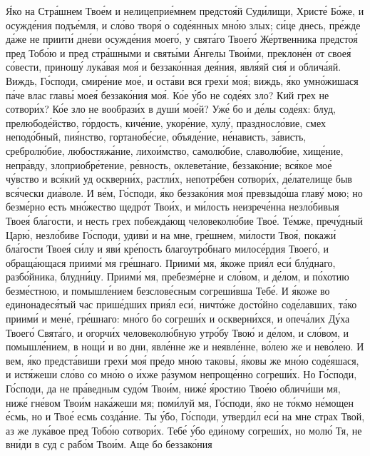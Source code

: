 \begin{mymulticols}
\'{Я}ко на Стр\'{а}шнем Тво\'{е}м и нелицепри\'{е}мнем предсто\'{я}й Суд\'{и}лищи, Христ\'{е} Б\'{о}же, и осужд\'{е}ния подъ\'{е}мля, и сл\'{о}во твор\'{я} о сод\'{е}янных мн\'{о}ю злых; с\'{и}це днесь, пр\'{е}жде д\'{а}же не приит\'{и} дн\'{е}ви осужд\'{е}ния моег\'{о}, у свят\'{а}го Твоег\'{о} Ж\'{е}ртвенника предсто\'{я} пред Тоб\'{о}ю и пред стр\'{а}шными и свят\'{ы}ми \'{А}нгелы Тво\'{и}ми, преклон\'{е}н от свое\'{я} с\'{о}вести, принош\'{у} лук\'{а}вая мо\'{я} и беззак\'{о}нная де\'{я}ния, явл\'{я}яй си\'{я} и облич\'{а}яй. Виждь, Г\'{о}споди, смир\'{е}ние мо\'{е}, и ост\'{а}ви вся грех\'{и} мо\'{я}; виждь, \'{я}ко умн\'{о}жишася п\'{а}че влас глав\'{ы} мое\'{я} беззак\'{о}ния мо\'{я}. К\'{о}е \'{у}бо не сод\'{е}ях зло? Кий грех не сотвор\'{и}х? К\'{о}е зло не вообраз\'{и}х в душ\'{и} мо\'{е}й? Уж\'{е} бо и д\'{е}лы сод\'{е}ях: блуд, прелюбод\'{е}йство, г\'{о}рдость, кич\'{е}ние, укор\'{е}ние, хул\'{у}, праздносл\'{о}вие, смех непод\'{о}бный, пи\'{я}нство, гортаноб\'{е}сие, объяд\'{е}ние, н\'{е}нависть, з\'{а}висть, среброл\'{ю}бие, любостяж\'{а}ние, лихо\'{и}мство, самол\'{ю}бие, славол\'{ю}бие, хищ\'{е}ние, непр\'{а}вду, злоприобр\'{е}тение, р\'{е}вность, оклевет\'{а}ние, беззак\'{о}ние; вс\'{я}кое мо\'{е} ч\'{у}вство и вс\'{я}кий уд оскверн\'{и}х, растл\'{и}х, непотр\'{е}бен сотвор\'{и}х, д\'{е}лателище быв вс\'{я}чески ди\'{а}воле. И в\'{е}м, Г\'{о}споди, \'{я}ко беззак\'{о}ния мо\'{я} превзыд\'{о}ша глав\'{у} мою; но безм\'{е}рно есть мн\'{о}жество щедр\'{о}т Тво\'{и}х, и м\'{и}лость неизреч\'{е}нна незл\'{о}бивыя Твое\'{я} бл\'{а}гости, и несть грех побежд\'{а}ющ человекол\'{ю}бие Тво\'{е}. Т\'{е}мже, преч\'{у}дный Цар\'{ю}, незл\'{о}биве Г\'{о}споди, удив\'{и} и на мне, гр\'{е}шнем, м\'{и}лости Тво\'{я}, покаж\'{и} бл\'{а}гости Твое\'{я} с\'{и}лу и яв\'{и} кр\'{е}пость благоутр\'{о}бнаго милос\'{е}рдия Твоег\'{о}, и обращ\'{а}ющася приим\'{и} мя гр\'{е}шнаго. Приим\'{и} мя, \'{я}коже при\'{я}л ес\'{и} бл\'{у}днаго, разб\'{о}йника, блудн\'{и}цу. Приим\'{и} мя, пребезм\'{е}рне и сл\'{о}вом, и д\'{е}лом, и п\'{о}хотию безм\'{е}стною, и помышл\'{е}нием безслов\'{е}сным согреш\'{и}вша Теб\'{е}. И \'{я}коже во единонадес\'{я}тый час приш\'{е}дших при\'{я}л ес\'{и}, ничт\'{о}же дост\'{о}йно сод\'{е}лавших, т\'{а}ко приим\'{и} и мен\'{е}, гр\'{е}шнаго: мн\'{о}го бо согреш\'{и}х и оскверн\'{и}хся, и опеч\'{а}лих Д\'{у}ха Твоег\'{о} Свят\'{а}го, и огорч\'{и}х человекол\'{ю}бную утр\'{о}бу Тво\'{ю} и д\'{е}лом, и сл\'{о}вом, и помышл\'{е}нием, в нощ\'{и} и во дни, явл\'{е}нне же и неявл\'{е}нне, в\'{о}лею же и нев\'{о}лею. И вем, \'{я}ко предст\'{а}виши грех\'{и} мо\'{я} пр\'{е}до мн\'{о}ю таков\'{ы}, \'{я}ковы же мн\'{о}ю сод\'{е}яшася, и ист\'{я}жеши сл\'{о}во со мн\'{о}ю о \'{и}хже р\'{а}зумом непрощ\'{е}нно согреш\'{и}х. Но Г\'{о}споди, Г\'{о}споди, да не пр\'{а}ведным суд\'{о}м Тво\'{и}м, ниж\'{е} \'{я}ростию Тво\'{е}ю облич\'{и}ши мя, ниж\'{е} гн\'{е}вом Тво\'{и}м нак\'{а}жеши мя; пом\'{и}луй мя, Г\'{о}споди, \'{я}ко не т\'{о}кмо н\'{е}мощен \'{е}смь, но и Тво\'{е} есмь созд\'{а}ние. Ты \'{у}бо, Г\'{о}споди, утверд\'{и}л ес\'{и} на мне страх Твой, аз же лук\'{а}вое пред Тоб\'{о}ю сотвор\'{и}х. Теб\'{е} \'{у}бо ед\'{и}ному согреш\'{и}х, но мол\'{ю} Тя, не вн\'{и}ди в суд с раб\'{о}м Тво\'{и}м. Аще бо беззак\'{о}ния 
\end{mymulticols}
